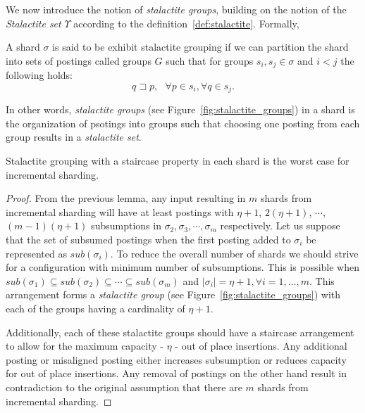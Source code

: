 We now introduce the notion of \emph{stalactite groups}, building on the notion of the \emph{Stalactite set} $\Upsilon$ according to the definition~\ref{def:stalactite}. Formally,

\begin{definition}
A shard $\sigma$ is said to be exhibit stalactite grouping if we can partition the shard into sets of postings called groups $G$ such that  for groups $s_i, s_j \in \sigma$ and $i<j$ the following holds:
$$
	q \sqsupset p , \,\,\,\, \forall p \in s_i, \forall q \in s_j.
$$
\end{definition}

In other words, \emph{stalactite groups} (see Figure~\ref{fig:stalactite_groups}) in a shard is the organization of psotings into groups such that choosing one posting from each group results in a \emph{stalactite set}.

\begin{lemma}
\label{lemma:stalactite_grouping}
	Stalactite grouping with a staircase property in each shard is the worst case for incremental sharding.
\end{lemma}

\begin{proof}{}
	From the previous lemma, any input resulting in $m$ shards from incremental sharding will have at least postings with $\eta+1$, $2(\eta+1)$, $\cdots$, $(m-1)(\eta+1)$ subsumptions in $\sigma_2, \sigma_3, \cdots, \sigma_m$ respectively. Let us suppose that the set of subsumed postings when the first posting added to $\sigma_i$ be represented as $sub(\sigma_i)$. To reduce the overall number of shards we should strive for a configuration with minimum number of subsumptions. This is possible when $sub(\sigma_1) \subseteq sub(\sigma_2) \subseteq \cdots \subseteq sub(\sigma_m)$ and $|\sigma_i| = \eta + 1, \forall i = 1,\ldots,m$. This arrangement forms a \emph{stalactite group} (see Figure~\ref{fig:stalactite_groups}) with each of the groups having a cardinality of $\eta+1$.


	Additionally, each of these stalactite groups should have a staircase arrangement to allow for the maximum capacity - $\eta$ - out of place insertions. Any additional posting or misaligned posting either increases subsumption or reduces capacity for out of place insertions. Any removal of postings on the other hand result in contradiction to the original assumption that there are $m$ shards from incremental sharding.
\end{proof}


